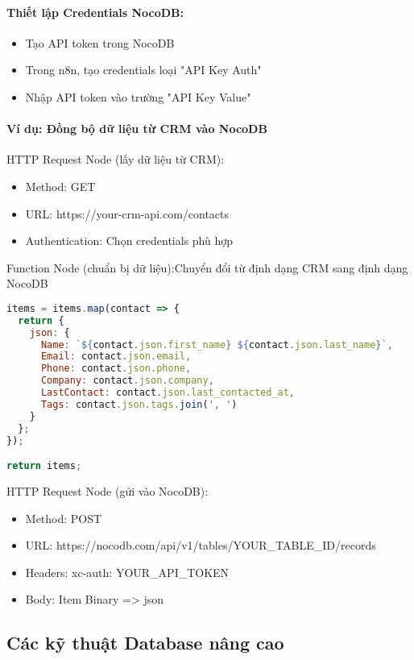 \paragraph{Thiết lập Credentials NocoDB:}
\begin{itemize}
    \item Tạo API token trong NocoDB
    \item Trong n8n, tạo credentials loại "API Key Auth"
    \item Nhập API token vào trường "API Key Value"
\end{itemize}

\paragraph{Ví dụ: Đồng bộ dữ liệu từ CRM vào NocoDB}

HTTP Request Node (lấy dữ liệu từ CRM):
\begin{itemize}
    \item Method: GET
    \item URL: https://your-crm-api.com/contacts
    \item Authentication: Chọn credentials phù hợp
\end{itemize}


Function Node (chuẩn bị dữ liệu):Chuyển đổi từ định dạng CRM sang định dạng NocoDB
\begin{lstlisting}[language=JavaScript]
items = items.map(contact => {
  return {
    json: {
      Name: `${contact.json.first_name} ${contact.json.last_name}`,
      Email: contact.json.email,
      Phone: contact.json.phone,
      Company: contact.json.company,
      LastContact: contact.json.last_contacted_at,
      Tags: contact.json.tags.join(', ')
    }
  };
});

return items;
\end{lstlisting}

HTTP Request Node (gửi vào NocoDB):
\begin{itemize}
    \item Method: POST
    \item URL: https://nocodb.com/api/v1/tables/YOUR\_TABLE\_ID/records
    \item Headers: xc-auth: YOUR\_API\_TOKEN
    \item Body: Item Binary => json
\end{itemize}

\subsection{Các kỹ thuật Database nâng cao}

